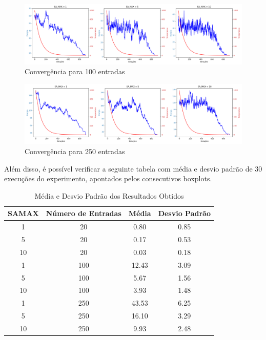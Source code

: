 \documentclass[12pt]{article}
\begin{document}
\begin{figure}[H]
  \centering
  \includegraphics[width=.9\textwidth]{../../melhores_sa_100.png}
  \caption{Convergência para 100 entradas}
  \label{fig:metodologia}
   \end{figure}

\begin{figure}[H]
  \centering
  \includegraphics[width=.9\textwidth]{../../melhores_sa_250.png}
  \caption{Convergência para 250 entradas}
  \label{fig:metodologia}
  \end{figure}


Além disso, é possível verificar a seguinte tabela com média e desvio padrão de 30 execuções do experimento, apontados pelos consecutivos boxplots.

\begin{table}[H]
\centering
\caption{Média e Desvio Padrão dos Resultados Obtidos}
\begin{tabular}{|c|c|c|c|}
\hline
\textbf{SAMAX} & \textbf{Número de Entradas} & \textbf{Média} & \textbf{Desvio Padrão} \\ \hline
1   & 20 & 0.80 & 0.85 \\ \hline
5   & 20 & 0.17 & 0.53 \\ \hline
10  & 20 & 0.03 & 0.18 \\ \hline
1   & 100 & 12.43 & 3.09 \\ \hline
5   & 100 & 5.67 & 1.56 \\ \hline
10  & 100 & 3.93 & 1.48 \\ \hline
1   & 250 & 43.53 & 6.25 \\ \hline
5   & 250 & 16.10 & 3.29 \\ \hline
10  & 250 & 9.93 & 2.48 \\ \hline

\end{tabular}
\label{tab:resultados}
\end{table}
\end{document}
